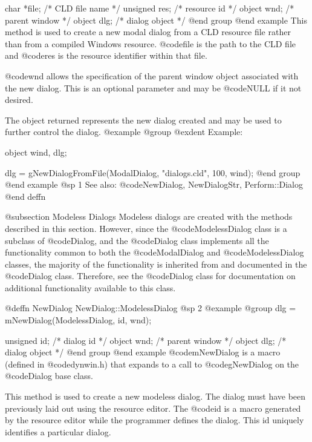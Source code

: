 char      *file;  /*  CLD file name  */
unsigned  res;    /*  resource id    */
object    wnd;    /*  parent window  */
object    dlg;    /*  dialog object  */
@end group
@end example
This method is used to create a new modal dialog from a CLD resource
file rather than from a compiled Windows resource.  @code{file} is the
path to the CLD file and @code{res} is the resource identifier within
that file.

@code{wnd} allows the specification of the parent window object associated
with the new dialog.  This is an optional parameter and may be @code{NULL}
if it not desired.

The object returned represents the new dialog created and may be
used to further control the dialog.
@example
@group
@exdent Example:

object  wind, dlg;

dlg = gNewDialogFromFile(ModalDialog, "dialogs.cld", 100, wind);
@end group
@end example
@sp 1
See also:  @code{NewDialog, NewDialogStr, Perform::Dialog}
@end deffn









@subsection Modeless Dialogs
Modeless dialogs are created with the methods described in this section.
However, since the @code{ModelessDialog} class is a subclass of
@code{Dialog}, and the @code{Dialog} class implements all the
functionality common to both the @code{ModalDialog} and
@code{ModelessDialog} classes, the majority of the functionality is
inherited from and documented in the @code{Dialog} class.  Therefore,
see the @code{Dialog} class for documentation on additional
functionality available to this class.




@deffn {NewDialog} NewDialog::ModelessDialog
@sp 2
@example
@group
dlg = mNewDialog(ModelessDialog, id, wnd);

unsigned  id;   /*  dialog id      */
object    wnd;  /*  parent window  */
object    dlg;  /*  dialog object  */
@end group
@end example
@code{mNewDialog} is a macro (defined in @code{dynwin.h}) that expands
to a call to @code{gNewDialog} on the @code{Dialog} base class.

This method is used to create a new modeless dialog.  The dialog must have
been previously laid out using the resource editor.  The @code{id}
is a macro generated by the resource editor while the programmer defines
the dialog.  This id uniquely identifies a particular dialog.

